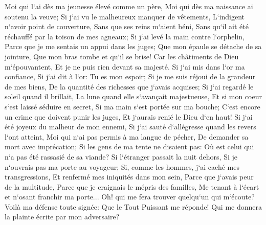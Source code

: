 \verse Moi qui l`ai dès ma jeunesse élevé comme un père, Moi qui dès ma naissance ai soutenu la veuve; 
\verse Si j`ai vu le malheureux manquer de vêtements, L`indigent n`avoir point de couverture, 
\verse Sans que ses reins m`aient béni, Sans qu`il ait été réchauffé par la toison de mes agneaux; 
\verse Si j`ai levé la main contre l`orphelin, Parce que je me sentais un appui dans les juges; 
\verse Que mon épaule se détache de sa jointure, Que mon bras tombe et qu`il se brise! 
\verse Car les châtiments de Dieu m`épouvantent, Et je ne puis rien devant sa majesté. 
\verse Si j`ai mis dans l`or ma confiance, Si j`ai dit à l`or: Tu es mon espoir; 
\verse Si je me suis réjoui de la grandeur de mes biens, De la quantité des richesses que j`avais acquises; 
\verse Si j`ai regardé le soleil quand il brillait, La lune quand elle s`avançait majestueuse, 
\verse Et si mon coeur s`est laissé séduire en secret, Si ma main s`est portée sur ma bouche; 
\verse C`est encore un crime que doivent punir les juges, Et j`aurais renié le Dieu d`en haut! 
\verse Si j`ai été joyeux du malheur de mon ennemi, Si j`ai sauté d`allégresse quand les revers l`ont atteint, 
\verse Moi qui n`ai pas permis à ma langue de pécher, De demander sa mort avec imprécation; 
\verse Si les gens de ma tente ne disaient pas: Où est celui qui n`a pas été rassasié de sa viande? 
\verse Si l`étranger passait la nuit dehors, Si je n`ouvrais pas ma porte au voyageur; 
\verse Si, comme les hommes, j`ai caché mes transgressions, Et renfermé mes iniquités dans mon sein, 
\verse Parce que j`avais peur de la multitude, Parce que je craignais le mépris des familles, Me tenant à l`écart et n`osant franchir ma porte... 
\verse Oh! qui me fera trouver quelqu`un qui m`écoute? Voilà ma défense toute signée: Que le Tout Puissant me réponde! Qui me donnera la plainte écrite par mon adversaire? 
